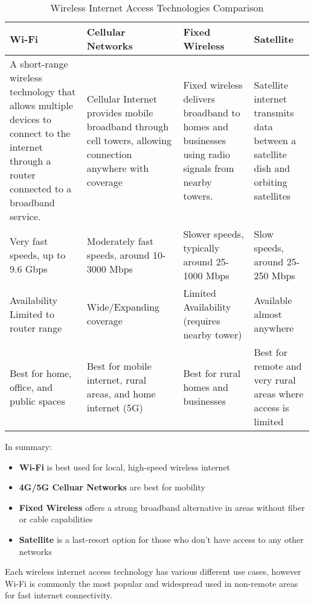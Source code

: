 \documentclass{article}
\begin{document}
\begin{table}[H]
    \centering
    \begin{tabular}{|p{3.5cm}|p{3.5cm}|p{3.5cm}|p{3.5cm}|}
        \hline
        \textbf{Wi-Fi} & \textbf{Cellular Networks} & \textbf{Fixed Wireless} & \textbf{Satellite} \\
        \hline 
        A short-range wireless technology that allows multiple devices to connect to the internet through a router connected to a broadband service.
        & Cellular Internet provides mobile broadband through cell towers, allowing connection anywhere with coverage
        & Fixed wireless delivers broadband to homes and businesses using radio signals from nearby towers.
        & Satellite internet transmits data between a satellite dish and orbiting satellites \\
        \hline
        Very fast speeds, up to 9.6 Gbps
        & Moderately fast speeds, around 10-3000 Mbps
        & Slower speeds, typically around 25-1000 Mbps
        & Slow speeds, around 25-250 Mbps \\
        \hline
        Availability Limited to router range
        & Wide/Expanding coverage
        & Limited Availability (requires nearby tower)
        & Available almost anywhere \\
        \hline
        Best for home, office, and public spaces
        & Best for mobile internet, rural areas, and home internet (5G)
        & Best for rural homes and businesses
        & Best for remote and very rural areas where access is limited \\
        \hline
    \end{tabular}
    \caption{Wireless Internet Access Technologies Comparison}
    \label{tab:my_label}
\end{table}
In summary: \begin{itemize}
    \item \textbf{Wi-Fi} is best used for local, high-speed wireless internet
    \item \textbf{4G/5G Celluar Networks} are best for mobility
    \item \textbf{Fixed Wireless} offers a strong broadband alternative in areas without fiber or cable capabilities
    \item \textbf{Satellite} is a last-resort option for those who don't have access to any other networks
\end{itemize}
Each wireless internet access technology has various different use cases, however Wi-Fi is commonly the most popular and widespread used in non-remote areas for fast internet connectivity.
\end{document}
